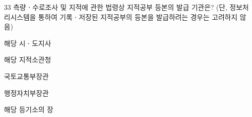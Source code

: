\begin{question}{33}
측량ㆍ수로조사 및 지적에 관한 법령상 지적공부 등본의 발급 기관은? (단, 정보처리시스템을 통하여 기록ㆍ저장된 지적공부의 등본을 발급하려는 경우는 고려하지 않음)
\begin{choices}
  \item 해당 시ㆍ도지사
  \item 해당 지적소관청
  \item 국토교통부장관
  \item 행정자치부장관
  \item 해당 등기소의 장
\end{choices}
\end{question}
